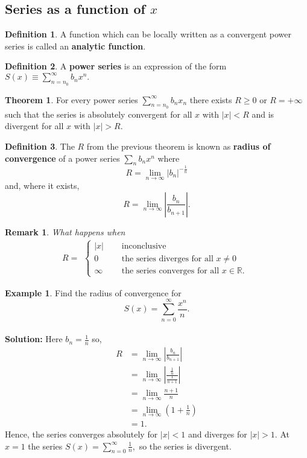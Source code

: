 \documentclass[12pt, a4paper]{article}
\newcommand{\f}[2]{\frac{#1}{#2}}
\newtheorem*{remark}{Remark}
\theoremstyle{definition}
\newtheorem{definition}{Definition}[section]
\newtheorem{theorem}{Theorem}[section]
\newtheorem*{example}{Example}
\theoremstyle{plain}
\begin{document}
\subsection{Series as a function of \texorpdfstring{$x$}{TEXT}}

\begin{definition}
A function which can be locally written as a convergent power series is called an \textbf{analytic function}.
\end{definition}

\begin{definition}
A \textbf{power series} is an expression of the form $S(x)\equiv \sum_{n=n_0}^{\infty} b_n x^n.$
\end{definition}

\begin{theorem}
For every power series $\sum_{n=n_0}^{\infty} b_nx_n$ there exists $R \geq 0$ or $R = +\infty$ such that the series is absolutely convergent for all $x$ with $|x| < R$ and is divergent for all $x$ with $|x| > R.$
\end{theorem}

\begin{definition}
The $R$ from the previous theorem is known as \textbf{radius of convergence} of a power series $\sum_{n} b_nx^n$ where $$R=\lim_{n \to \infty} |b_n|^{-\frac{1}{n}}$$ and, where it exists, $$R=\lim_{n \to \infty} \left|\frac{b_n}{b_{n+1}}\right|.$$
\end{definition}

\begin{remark}
What happens when $$R = \begin{aligned}
\begin{cases} 
      |x| \quad&\text{ inconclusive} \\
      0 \quad&\text{ the series diverges for all } x \neq 0  \\
      \infty \quad&\text{ the series converges for all } x \in \mathbb{R}.
\end{cases}
\end{aligned}$$
\end{remark}

\begin{example}
Find the radius of convergence for $$S(x)=\sum_{n=0}^{\infty} \f{x^n}{n}.$$ \\
\textbf{Solution:} Here $b_n=\f{1}{n}$ so, $$\begin{aligned}
R 	&=\lim_{n\to \infty} \left|\f{b_n}{b_{n+1}}\right| \\
	&=\lim_{n\to \infty} \left|\f{\f{1}{n}}{\f{1}{n+1}}\right| \\
	&= \lim_{n\to \infty}\f{n+1}{n} \\
	&= \lim_{n\to \infty}\left(1+\f{1}{n}\right) \\
	&=1.
\end{aligned}$$ Hence, the series converges absolutely for $|x|<1$ and diverges for $|x|>1.$ At $x=1$ the series $S(x)=\sum_{n=0}^{\infty} \f{1}{n},$ so the series is divergent.
\end{example}
\end{document}
